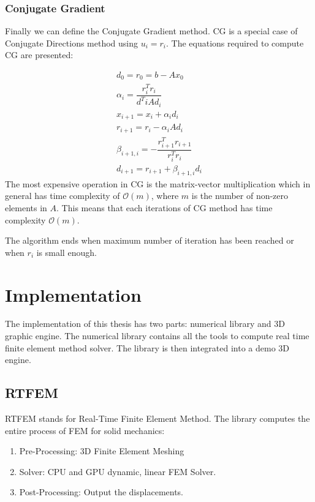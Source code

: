 \documentclass[en]{minipw} %
\begin{document}
\subsection{Conjugate Gradient}
Finally we can define the Conjugate Gradient method. CG is a special case of Conjugate Directions method using $u_i = r_i$. The equations required to compute CG are presented:

\begin{equation}
\begin{aligned}
d_0 = r_0 = b - Ax_0
\\
\alpha_i = \dfrac{r^{T}_{i} r_{i}}{d^{T}{i} A d_{i}}
\\
x_{i+1} = x_{i} + \alpha_{i}d_{i}
\\
r_{i+1} = r_{i} - \alpha_{i}Ad_{i}
\\
\beta_{i+1,i} = - \dfrac{r^{T}_{i+1} r_{i+1}}{r^{T}_{i} r_{i}}
\\
d_{i+1} = r_{i+1} + \beta_{i+1,i} d_{i}
\end{aligned}
\end{equation}
The most expensive operation in CG is the matrix-vector multiplication which in general has time complexity of $\mathcal{O}(m)$, where $m$ is the number of non-zero elements in $A$. This means that each iterations of CG method has time complexity $\mathcal{O}(m)$.

The algorithm ends when maximum number of iteration has been reached or when $r_i$ is small enough.

\chapter{Implementation}
\label{chap:Implementation}

The implementation of this thesis has two parts: numerical library and 3D graphic engine. The numerical library contains all the tools to compute real time finite element method solver. The library is then integrated into a demo 3D engine.

\section{RTFEM}
RTFEM stands for Real-Time Finite Element Method. The library computes the entire process of FEM for solid mechanics:
\begin{enumerate}
\item Pre-Processing: 3D Finite Element Meshing
\item Solver: CPU and GPU dynamic, linear FEM Solver.
\item Post-Processing: Output the displacements.
\end{enumerate}
\end{document}
